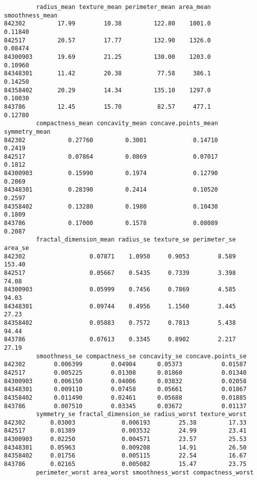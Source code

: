 \documentclass[
  letterpaper,
  DIV=11,
  numbers=noendperiod]{scrartcl}
\begin{document}
\begin{verbatim}
         radius_mean texture_mean perimeter_mean area_mean smoothness_mean
842302         17.99        10.38         122.80    1001.0         0.11840
842517         20.57        17.77         132.90    1326.0         0.08474
84300903       19.69        21.25         130.00    1203.0         0.10960
84348301       11.42        20.38          77.58     386.1         0.14250
84358402       20.29        14.34         135.10    1297.0         0.10030
843786         12.45        15.70          82.57     477.1         0.12780
         compactness_mean concavity_mean concave.points_mean symmetry_mean
842302            0.27760         0.3001             0.14710        0.2419
842517            0.07864         0.0869             0.07017        0.1812
84300903          0.15990         0.1974             0.12790        0.2069
84348301          0.28390         0.2414             0.10520        0.2597
84358402          0.13280         0.1980             0.10430        0.1809
843786            0.17000         0.1578             0.08089        0.2087
         fractal_dimension_mean radius_se texture_se perimeter_se area_se
842302                  0.07871    1.0950     0.9053        8.589  153.40
842517                  0.05667    0.5435     0.7339        3.398   74.08
84300903                0.05999    0.7456     0.7869        4.585   94.03
84348301                0.09744    0.4956     1.1560        3.445   27.23
84358402                0.05883    0.7572     0.7813        5.438   94.44
843786                  0.07613    0.3345     0.8902        2.217   27.19
         smoothness_se compactness_se concavity_se concave.points_se
842302        0.006399        0.04904      0.05373           0.01587
842517        0.005225        0.01308      0.01860           0.01340
84300903      0.006150        0.04006      0.03832           0.02058
84348301      0.009110        0.07458      0.05661           0.01867
84358402      0.011490        0.02461      0.05688           0.01885
843786        0.007510        0.03345      0.03672           0.01137
         symmetry_se fractal_dimension_se radius_worst texture_worst
842302       0.03003             0.006193        25.38         17.33
842517       0.01389             0.003532        24.99         23.41
84300903     0.02250             0.004571        23.57         25.53
84348301     0.05963             0.009208        14.91         26.50
84358402     0.01756             0.005115        22.54         16.67
843786       0.02165             0.005082        15.47         23.75
         perimeter_worst area_worst smoothness_worst compactness_worst

\end{verbatim}
\end{document}
